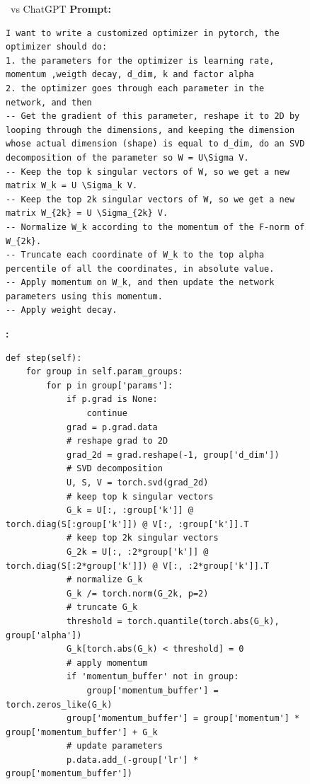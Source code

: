 \begin{figure}[H]
\begin{AIbox}{\DV~vs ChatGPT}
{\bf Prompt:}
\begin{verbatim}
I want to write a customized optimizer in pytorch, the optimizer should do:
1. the parameters for the optimizer is learning rate, momentum ,weigth decay, d_dim, k and factor alpha
2. the optimizer goes through each parameter in the network, and then
-- Get the gradient of this parameter, reshape it to 2D by looping through the dimensions, and keeping the dimension whose actual dimension (shape) is equal to d_dim, do an SVD decomposition of the parameter so W = U\Sigma V. 
-- Keep the top k singular vectors of W, so we get a new matrix W_k = U \Sigma_k V. 
-- Keep the top 2k singular vectors of W, so we get a new matrix W_{2k} = U \Sigma_{2k} V. 
-- Normalize W_k according to the momentum of the F-norm of W_{2k}.
-- Truncate each coordinate of W_k to the top alpha  percentile of all the coordinates, in absolute value.
-- Apply momentum on W_k, and then update the network parameters using this momentum.
-- Apply weight decay.
\end{verbatim}
\begin{minipage}[t]{0.5\linewidth}
{\bf \DV:}
\begin{verbatim}
def step(self):
    for group in self.param_groups:
        for p in group['params']:
            if p.grad is None:
                continue
            grad = p.grad.data
            # reshape grad to 2D
            grad_2d = grad.reshape(-1, group['d_dim'])
            # SVD decomposition
            U, S, V = torch.svd(grad_2d)
            # keep top k singular vectors
            G_k = U[:, :group['k']] @ torch.diag(S[:group['k']]) @ V[:, :group['k']].T
            # keep top 2k singular vectors
            G_2k = U[:, :2*group['k']] @ torch.diag(S[:2*group['k']]) @ V[:, :2*group['k']].T
            # normalize G_k 
            G_k /= torch.norm(G_2k, p=2)
            # truncate G_k 
            threshold = torch.quantile(torch.abs(G_k), group['alpha'])
            G_k[torch.abs(G_k) < threshold] = 0
            # apply momentum
            if 'momentum_buffer' not in group:
                group['momentum_buffer'] = torch.zeros_like(G_k)
            group['momentum_buffer'] = group['momentum'] * group['momentum_buffer'] + G_k 
            # update parameters
            p.data.add_(-group['lr'] * group['momentum_buffer'])

\end{verbatim}
\end{minipage}
\end{AIbox}
\end{figure}
